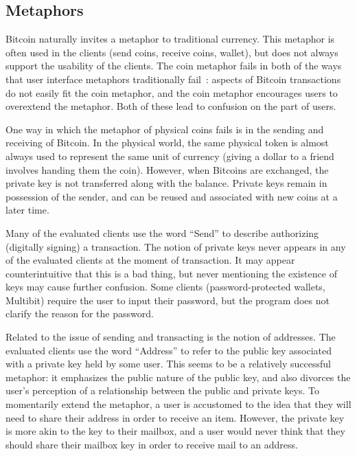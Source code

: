 

\subsection{Metaphors}
Bitcoin naturally invites a metaphor to traditional currency. This metaphor is often used in the clients (\eg send coins, receive coins, wallet), but does not always support the usability of the clients. The coin metaphor fails in both of the ways that user interface metaphors traditionally fail~\cite{metaphorpaper}: aspects of Bitcoin transactions do not easily fit the coin metaphor, and the coin metaphor encourages users to overextend the metaphor. Both of these lead to confusion on the part of users.   %

One way in which the metaphor of physical coins fails is in the sending and receiving of Bitcoin. In the physical world, the same physical token is almost always used to represent the same unit of currency (\ie giving a dollar to a friend involves handing them the coin). However, when Bitcoins are exchanged, the private key is not transferred along with the balance. Private keys remain in possession of the sender, and can be reused and associated with new coins at a later time. 

Many of the evaluated clients use the word ``Send'' to describe authorizing (digitally signing) a transaction. The notion of private keys never appears in any of the evaluated clients at the moment of transaction. It may appear counterintuitive that this is a bad thing, but never mentioning the existence of keys may cause further confusion. Some clients (password-protected wallets, \eg Multibit) require the user to input their password, but the program does not clarify the reason for the password.

Related to the issue of sending and transacting is the notion of addresses. The evaluated clients use the word ``Address'' to refer to the public key associated with a private key held by some user. This seems to be a relatively successful metaphor: it emphasizes the public nature of the public key, and also divorces the user's perception of a relationship between the public and private keys. To momentarily extend the metaphor, a user is accustomed to the idea that they will need to share their address in order to receive an item. However, the private key is more akin to the key to their mailbox, and a user would never think that they should share their mailbox key in order to receive mail to an address. 


